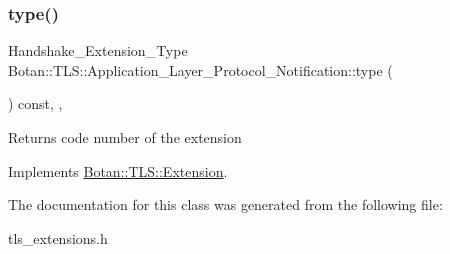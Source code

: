 \mbox{\label{class_botan_1_1_t_l_s_1_1_application___layer___protocol___notification_ab60d32531c669dd0d23fdddec69eee17}} 
\subsubsection{\texorpdfstring{type()}{type()}}
{\footnotesize\ttfamily Handshake\+\_\+\+Extension\+\_\+\+Type Botan\+::\+T\+L\+S\+::\+Application\+\_\+\+Layer\+\_\+\+Protocol\+\_\+\+Notification\+::type (\begin{DoxyParamCaption}{ }\end{DoxyParamCaption}) const\hspace{0.3cm}{\ttfamily [inline]}, {\ttfamily [override]}, {\ttfamily [virtual]}}

\begin{DoxyReturn}{Returns}
code number of the extension 
\end{DoxyReturn}


Implements \hyperlink{class_botan_1_1_t_l_s_1_1_extension_ac8819b312ce604453225e7b4f7c373ec}{Botan\+::\+T\+L\+S\+::\+Extension}.



The documentation for this class was generated from the following file\+:\begin{DoxyCompactItemize}
\item 
tls\+\_\+extensions.\+h\end{DoxyCompactItemize}
